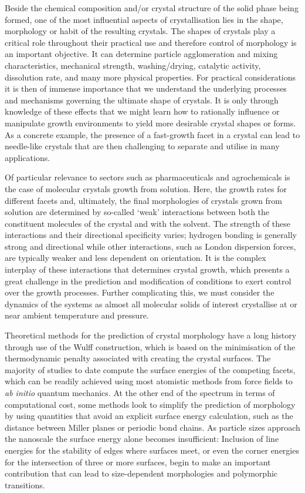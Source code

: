 \documentclass[twoside,twocolumn,9pt]{article}
\begin{document}
Beside the chemical composition and/or crystal structure of the solid phase being formed, one of the most influential aspects of crystallisation lies in the shape, morphology or habit of the resulting crystals.
The shapes of crystals play a critical role throughout their practical use and therefore control of morphology is an important objective.\cite{Dandekar2013} It can determine particle agglomeration and mixing characteristics, mechanical strength, washing/drying, catalytic activity, dissolution rate, and many more physical properties. For practical considerations it is then of immense importance that we understand the underlying processes and mechanisms governing the ultimate shape of crystals. It is only through knowledge of these effects that we might learn how to rationally influence or manipulate growth environments to yield more desirable crystal shapes or forms. As a concrete example, the presence of a fast-growth facet in a crystal can lead to needle-like crystals that are then challenging to separate and utilise in many applications.\cite{Lovette2013}

Of particular relevance to sectors such as pharmaceuticals and agrochemicals is the case of molecular crystals growth from solution. Here, the growth rates for different facets and, ultimately, the final morphologies of crystals grown from solution are determined by so-called ‘weak’ interactions between both the constituent molecules of the crystal and with the solvent. The strength of these interactions and their directional specificity varies; 
hydrogen bonding is generally strong and directional while other interactions, such as London dispersion forces, are typically weaker and less dependent on orientation. It is the complex interplay of these interactions that determines crystal growth, which presents a great challenge in the prediction and modification of conditions to exert control over the growth processes. Further complicating this, we must consider the dynamics of the systems as almost all molecular solids of interest crystallise at or near ambient temperature and pressure.

Theoretical methods for the prediction of crystal morphology have a long history through use of the Wulff construction,\cite{Wulff1901} which is based on the minimisation of the thermodynamic penalty associated with creating the crystal surfaces. 
The majority of studies to date compute the surface energies of the competing facets, which can be readily achieved using most atomistic methods from force fields to \emph{ab initio} quantum mechanics. At the other end of the spectrum in terms of computational cost, some methods look to simplify the prediction of morphology by using quantities that avoid an explicit surface energy calculation, such as the distance between Miller planes\cite{Bravais1886,Friedel1907,Donnay1937} or periodic bond chains\cite{Hartman1955}. As particle sizes approach the nanoscale the surface energy alone becomes insufficient: Inclusion of line energies for the stability of edges where surfaces meet, or even the corner energies for the intersection of three or more surfaces, begin to make an important contribution that can lead to size-dependent morphologies\cite{Barnard2004} and polymorphic transitions\cite{Navrotsky2004}.
\end{document}
